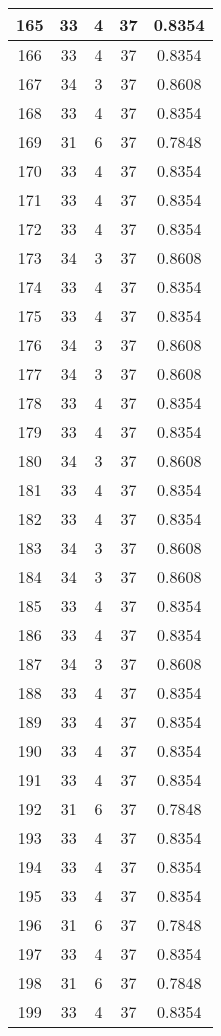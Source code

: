 \documentclass[letterpaper, 12pt]{article}
\begin{document}
\begin{longtable}{|c|c|c|c|c|}
\hline
165 & 33 & 4 & 37 & 0.8354 \\
\hline
166 & 33 & 4 & 37 & 0.8354 \\
\hline
167 & 34 & 3 & 37 & 0.8608 \\
\hline
168 & 33 & 4 & 37 & 0.8354 \\
\hline
169 & 31 & 6 & 37 & 0.7848 \\
\hline
170 & 33 & 4 & 37 & 0.8354 \\
\hline
171 & 33 & 4 & 37 & 0.8354 \\
\hline
172 & 33 & 4 & 37 & 0.8354 \\
\hline
173 & 34 & 3 & 37 & 0.8608 \\
\hline
174 & 33 & 4 & 37 & 0.8354 \\
\hline
175 & 33 & 4 & 37 & 0.8354 \\
\hline
176 & 34 & 3 & 37 & 0.8608 \\
\hline
177 & 34 & 3 & 37 & 0.8608 \\
\hline
178 & 33 & 4 & 37 & 0.8354 \\
\hline
179 & 33 & 4 & 37 & 0.8354 \\
\hline
180 & 34 & 3 & 37 & 0.8608 \\
\hline
181 & 33 & 4 & 37 & 0.8354 \\
\hline
182 & 33 & 4 & 37 & 0.8354 \\
\hline
183 & 34 & 3 & 37 & 0.8608 \\
\hline
184 & 34 & 3 & 37 & 0.8608 \\
\hline
185 & 33 & 4 & 37 & 0.8354 \\
\hline
186 & 33 & 4 & 37 & 0.8354 \\
\hline
187 & 34 & 3 & 37 & 0.8608 \\
\hline
188 & 33 & 4 & 37 & 0.8354 \\
\hline
189 & 33 & 4 & 37 & 0.8354 \\
\hline
190 & 33 & 4 & 37 & 0.8354 \\
\hline
191 & 33 & 4 & 37 & 0.8354 \\
\hline
192 & 31 & 6 & 37 & 0.7848 \\
\hline
193 & 33 & 4 & 37 & 0.8354 \\
\hline
194 & 33 & 4 & 37 & 0.8354 \\
\hline
195 & 33 & 4 & 37 & 0.8354 \\
\hline
196 & 31 & 6 & 37 & 0.7848 \\
\hline
197 & 33 & 4 & 37 & 0.8354 \\
\hline
198 & 31 & 6 & 37 & 0.7848 \\
\hline
199 & 33 & 4 & 37 & 0.8354 \\
\hline
\end{longtable}
\end{document}
